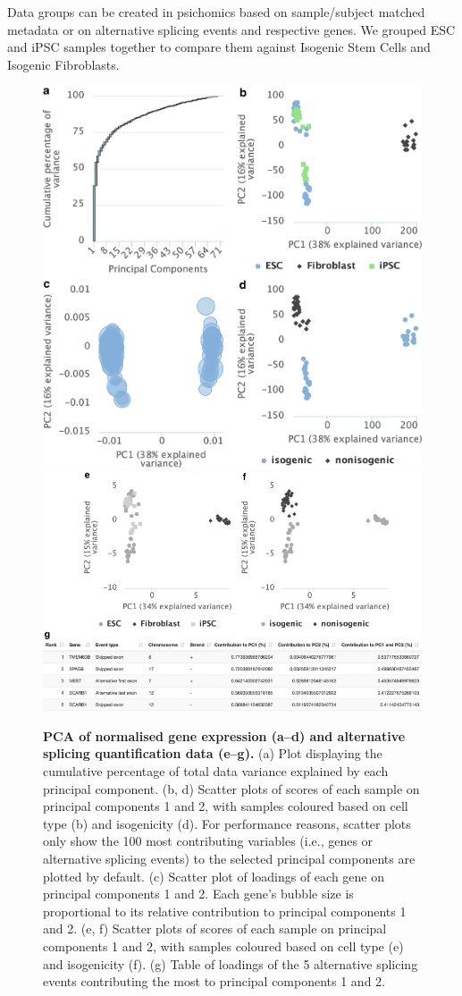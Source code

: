 Data groups can be created in psichomics based on sample/subject matched metadata or on alternative splicing events and respective genes. We grouped ESC and iPSC samples together to compare them against Isogenic Stem Cells and Isogenic Fibroblasts.

\begin{figure}[!p]
  \includegraphics[width=.7\textwidth]{images/psichomics/5-pca-a}
  \includegraphics[width=.9\textwidth]{images/psichomics/5-pca-b}
  \centering
  \caption[Principal component analysis]{\textbf{PCA of normalised gene expression (a–d) and alternative splicing quantification data (e–g).} (a) Plot displaying the cumulative percentage of total data variance explained by each principal component. (b, d) Scatter plots of scores of each sample on principal components 1 and 2, with samples coloured based on cell type (b) and isogenicity (d). For performance reasons, scatter plots only show the 100 most contributing variables (i.e., genes or alternative splicing events) to the selected principal components are plotted by default. (c) Scatter plot of loadings of each gene on principal components 1 and 2. Each gene’s bubble size is proportional to its relative contribution to principal components 1 and 2. (e, f) Scatter plots of scores of each sample on principal components 1 and 2, with samples coloured based on cell type (e) and isogenicity (f). (g) Table of loadings of the 5 alternative splicing events contributing the most to principal components 1 and 2.}
  \label{fig:psichomics-pca}
\end{figure}

